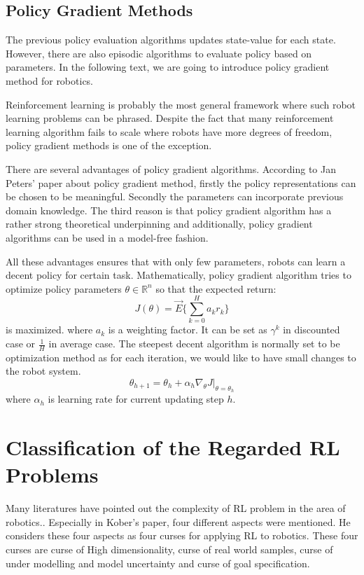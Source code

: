 \documentclass[officiallayout]{tktla}
\begin{document}
\newcommand{\wm}{\widehat{m}_t}
\newcommand{\wv}{\widehat{v}_t}



\subsection{Policy Gradient Methods}
The previous policy evaluation algorithms updates state-value for each state. However, there are also episodic algorithms to evaluate policy based on parameters. In the following text, we are going to introduce policy gradient method for robotics.

Reinforcement learning is probably the most general framework where such robot learning problems can be phrased. Despite the fact that many reinforcement learning algorithm fails to scale where robots have more degrees of freedom, policy gradient methods is one of the exception.

There are several advantages of policy gradient algorithms. According to Jan Peters' paper about policy gradient method\cite{peters2006policy}, firstly the policy representations can be chosen to be meaningful. Secondly the parameters can incorporate previous domain knowledge. The third reason is that policy gradient algorithm has a rather strong theoretical underpinning and additionally, policy gradient algorithms can be used in a model-free fashion.

All these advantages ensures that with only few parameters, robots can learn a decent policy for certain task. Mathematically, policy gradient algorithm tries to optimize policy parameters $\theta \in \mathbb{R}^n$ so that the expected return:
\begin{equation}
J(\theta) = \vec{E}\{\sum_{k=0}^Ha_k r_k\}
\end{equation}
is maximized. where $a_k$ is a weighting factor. It can be set as $\gamma^k$ in discounted case or $\frac{1}{H}$ in average case. The steepest decent algorithm is normally set to be optimization method as for each iteration, we would like to have small changes to the robot system. 
\begin{equation}
\theta_{h+1} = \theta_h + \alpha_h \nabla_\theta J|_{\theta=\theta_h}
\end{equation}
where $\alpha_h$ is learning rate for current updating step $h$.

\section{Classification of the Regarded RL Problems}
Many literatures have pointed out the complexity of RL problem in the area of robotics.\cite{Kober2013}\cite{peters2006policy}. Especially in Kober's paper\cite{Kober2013}, four different aspects were mentioned. He considers these four aspects as four curses for applying RL to robotics. These four curses are curse of High dimensionality, curse of real world samples, curse of under modelling and model uncertainty and curse of goal specification.
\end{document}
